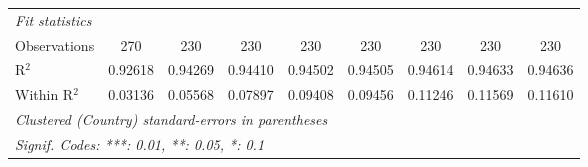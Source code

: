 \begin{table}[htbp]
\begin{tabular}{lcccccccc}
      \midrule
      \emph{Fit statistics}\\
      Observations                            & 270             & 230            & 230      & 230           & 230           & 230           & 230            & 230\\  
      R$^2$                                   & 0.92618         & 0.94269        & 0.94410  & 0.94502       & 0.94505       & 0.94614       & 0.94633        & 0.94636\\  
      Within R$^2$                            & 0.03136         & 0.05568        & 0.07897  & 0.09408       & 0.09456       & 0.11246       & 0.11569        & 0.11610\\  
      \midrule \midrule
      \multicolumn{9}{l}{\emph{Clustered (Country) standard-errors in parentheses}}\\
      \multicolumn{9}{l}{\emph{Signif. Codes: ***: 0.01, **: 0.05, *: 0.1}}\\
   \end{tabular}
\end{table}


